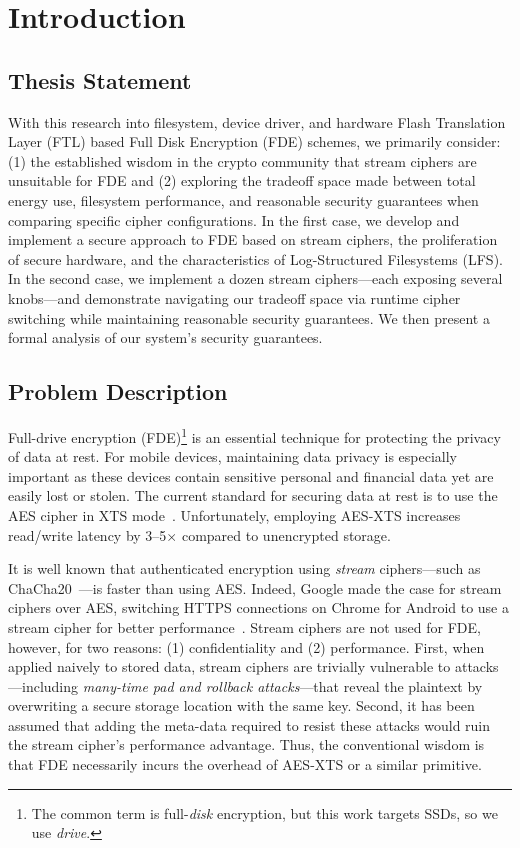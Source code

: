 \chapter{Introduction} \label{chp:introduction}

\section{Thesis Statement}

With this research into filesystem, device driver, and hardware Flash
Translation Layer (FTL) based Full Disk Encryption (FDE) schemes, we primarily
consider: (1) the established wisdom in the crypto community that stream ciphers
are unsuitable for FDE and (2) exploring the tradeoff space made between total
energy use, filesystem performance, and reasonable security guarantees when
comparing specific cipher configurations. In the first case, we develop and
implement a secure approach to FDE based on stream ciphers, the proliferation of
secure hardware, and the characteristics of Log-Structured Filesystems (LFS). In
the second case, we implement a dozen stream ciphers---each exposing several
knobs---and demonstrate navigating our tradeoff space via runtime cipher
switching while maintaining reasonable security guarantees. We then present a
formal analysis of our system's security guarantees.

\section{Problem Description}

Full-drive encryption (FDE)\footnote{The common term is full-\emph{disk}
encryption, but this work targets SSDs, so we use \emph{drive}.} is an essential
technique for protecting the privacy of data at rest. For mobile devices,
maintaining data privacy is especially important as these devices contain
sensitive personal and financial data yet are easily lost or stolen. The current
standard for securing data at rest is to use the AES cipher in XTS
mode~\cite{XTS, NISTXTS}. Unfortunately, employing AES-XTS increases read/write
latency by 3--5$\times$ compared to unencrypted storage.

It is well known that authenticated encryption using \emph{stream}
ciphers---such as ChaCha20~\cite{ChaCha20}---is faster than using AES. Indeed,
Google made the case for stream ciphers over AES, switching HTTPS connections on
Chrome for Android to use a stream cipher for better
performance~\cite{google-blog}. Stream ciphers are not used for FDE, however,
for two reasons: (1) confidentiality and (2) performance. First, when applied
naively to stored data, stream ciphers are trivially vulnerable to
attacks---including \emph{many-time pad and rollback attacks}---that reveal the
plaintext by overwriting a secure storage location with the same key. Second, it
has been assumed that adding the meta-data required to resist these attacks
would ruin the stream cipher's performance advantage. Thus, the conventional
wisdom is that FDE necessarily incurs the overhead of AES-XTS or a similar
primitive.

